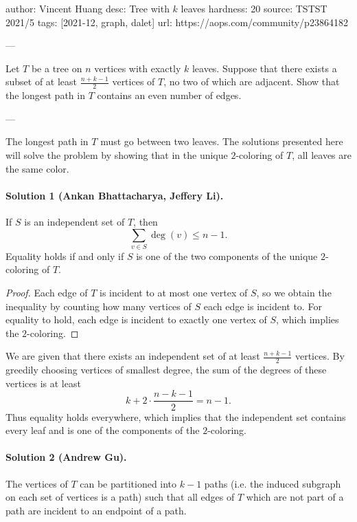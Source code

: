 author: Vincent Huang
desc: Tree with $k$ leaves
hardness: 20
source: TSTST 2021/5
tags: [2021-12, graph, dalet]
url: https://aops.com/community/p23864182

---

Let $T$ be a tree on $n$ vertices with exactly $k$ leaves.
Suppose that there exists a subset of
at least $\frac{n+k-1}{2}$ vertices of $T$,
no two of which are adjacent.
Show that the longest path in $T$ contains
an even number of edges.

---

The longest path in $T$ must go between two leaves. The solutions presented here
will solve the problem by showing that in the unique $2$-coloring of $T$, all
leaves are the same color.

\paragraph{Solution 1 (Ankan Bhattacharya, Jeffery Li).}
\begin{lemma*}
  If $S$ is an independent set of $T$, then
  \[\sum_{v\in S}\deg(v)\leq n-1.\]
  Equality holds if and only if $S$ is one of the two components of the unique
  $2$-coloring of $T$.
\end{lemma*}

\begin{proof}
  Each edge of $T$ is incident to at most one vertex of $S$, so we obtain the
  inequality by counting how many vertices of $S$ each edge is incident to. For
  equality to hold, each edge is incident to exactly one vertex of $S$, which
  implies the $2$-coloring.
\end{proof}

We are given that there exists an independent set of at least $\frac{n+k-1}{2}$
vertices. By greedily choosing vertices of smallest degree, the sum of the
degrees of these vertices is at least
\[k+2\cdot\frac{n-k-1}{2}=n-1.\]
Thus equality holds everywhere, which implies that the independent set contains
every leaf and is one of the components of the $2$-coloring.

\paragraph{Solution 2 (Andrew Gu).}

\begin{lemma*}
  The vertices of $T$ can be partitioned into $k-1$ paths (i.e. the induced
  subgraph on each set of vertices is a path) such that all edges of $T$
  which are not part of a path are incident to an endpoint of a path.
\end{lemma*}

